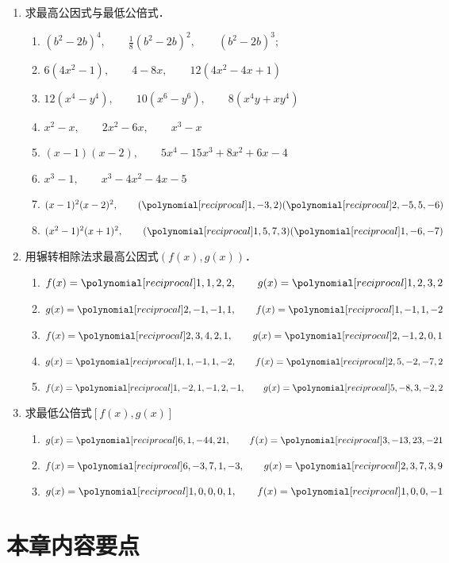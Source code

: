 \begin{enumerate}
\item 求最高公因式与最低公倍式．
\begin{enumerate}
\item $\left(b^{2}-2 b\right)^{4},\qquad   \frac{1}{8}\left(b^{2}-2 b\right)^{2},\qquad  \left(b^{2}-2 b\right)^{3} ;$
\item $6\left(4 x^{2}-1\right),\qquad   4-8 x ,\qquad   12\left(4 x^{2}-4 x + 1\right)$
\item $12\left(x^{4}-y^{4}\right),\qquad   10\left(x^{6}-y^{6}\right),\qquad   8\left(x^{4} y+x y^{4}\right)$
\item $x^{2}-x, \qquad  2 x^{2}-6 x,\qquad   x^{3}-x$
\item $(x-1)(x-2),\qquad   5 x^{4}-15 x^{3}+8 x^{2}+6 x-4$
\item $x^{3}-1,\qquad   x^{3}-4 x^{2}-4 x-5$
\item $(x-1)^{2}(x-2)^{2},\qquad (\poly{1,-3,2})(\poly{2,-5,5,-6})$
\item $(x^2-1)^2(x+1)^2,\qquad (\poly{1,5,7,3})(\poly{1,-6,-7})$
\end{enumerate}

\item 用辗转相除法求最高公因式$(f(x),g(x))$．
\begin{enumerate}
    \item $f(x)=\poly{1,1,2,2},\qquad g(x)=\poly{1,2,3,2}$
    \item $g(x)=\poly{2,-1,-1,1},\qquad f(x)=\poly{1,-1,1,-2}$
    \item $f(x)=\poly{2,3,4,2,1},\qquad g(x)=\poly{2,-1,2,0,1}$
    \item $g(x)=\poly{1,1,-1,1,-2},\qquad f(x)=\poly{2,5,-2,-7,2}$
    \item $f(x)=\poly{1,-2,1,-1,2,-1},\qquad g(x)=\poly{5,-8,3,-2,2}$
\end{enumerate}

\item 求最低公倍式$[f(x),g(x)]$
\begin{enumerate}
    \item $g(x)=\poly{6,1,-44,21},\qquad f(x)=\poly{3,-13,23,-21}$
    \item $f(x)=\poly{6,-3,7,1,-3},\qquad g(x)=\poly{2,3,7,3,9}$
    \item $g(x)=\poly{1,0,0,0,1},\qquad f(x)=\poly{1,0,0,-1}$
\end{enumerate}

\end{enumerate}

\section*{本章内容要点}

